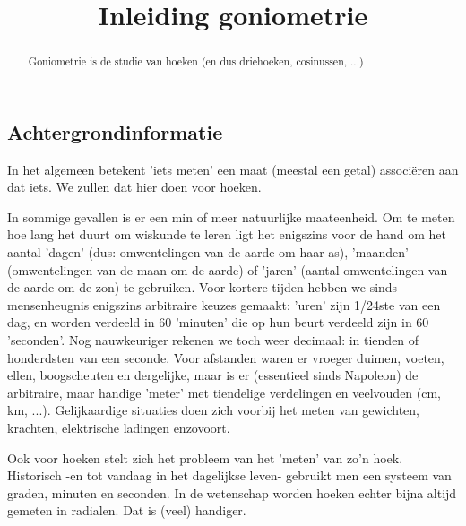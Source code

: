 \documentclass{ximera}
\title[Examples:]{Inleiding goniometrie}
\begin{document}
\begin{abstract}
	Goniometrie is de studie van hoeken (en dus driehoeken, cosinussen, ...)
\end{abstract}
\maketitle


\subsection{Achtergrondinformatie}
	In het algemeen betekent 'iets meten' een maat (meestal een getal) associëren aan dat iets. We zullen dat hier doen voor hoeken.
\begin{expandable}
	In sommige gevallen is er een min of meer natuurlijke maateenheid. Om te meten hoe lang het duurt om wiskunde te leren ligt het enigszins voor de hand om het aantal 'dagen' (dus: omwentelingen van de aarde om haar as), 'maanden' (omwentelingen van de maan om de aarde) of 'jaren' (aantal omwentelingen van de aarde om de zon) te gebruiken. Voor kortere tijden hebben we sinds mensenheugnis enigszins arbitraire keuzes gemaakt: 'uren' zijn 1/24ste van een dag, en worden verdeeld in 60 'minuten' die op hun beurt verdeeld zijn in 60 'seconden'. Nog nauwkeuriger rekenen we toch weer decimaal: in tienden of honderdsten van een seconde. Voor afstanden waren er vroeger duimen, voeten, ellen, boogscheuten en dergelijke, maar is er (essentieel sinds Napoleon) de arbitraire, maar handige 'meter' met tiendelige verdelingen en veelvouden (cm, km, ...). Gelijkaardige situaties doen zich voorbij het meten van gewichten, krachten, elektrische ladingen enzovoort.

	Ook voor hoeken stelt zich het probleem van het 'meten' van zo'n hoek. Historisch -en tot vandaag in het dagelijkse leven- gebruikt men een systeem van graden, minuten en seconden. In de wetenschap worden hoeken echter bijna altijd gemeten in radialen. Dat is (veel) handiger.
\end{expandable}
\end{document}
